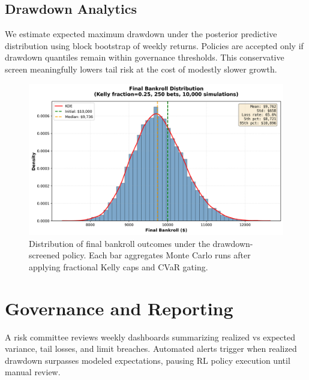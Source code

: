 \subsection{Drawdown Analytics}
We estimate expected maximum drawdown under the posterior predictive distribution using block bootstrap of weekly returns. Policies are accepted only if drawdown quantiles remain within governance thresholds. This conservative screen meaningfully lowers tail risk at the cost of modestly slower growth.

\begin{figure}[t]
  \centering
  \includegraphics[width=0.9\linewidth]{../figures/bankroll_hist.png}
  \caption[Final bankroll distribution]{Distribution of final bankroll outcomes under the drawdown-screened policy. Each bar aggregates Monte Carlo runs after applying fractional Kelly caps and CVaR gating.}
  \label{fig:bankroll-hist}
\end{figure}

\section{Governance and Reporting}
A risk committee reviews weekly dashboards summarizing realized vs expected variance, tail losses, and limit breaches. Automated alerts trigger when realized drawdown surpasses modeled expectations, pausing RL policy execution until manual review.



